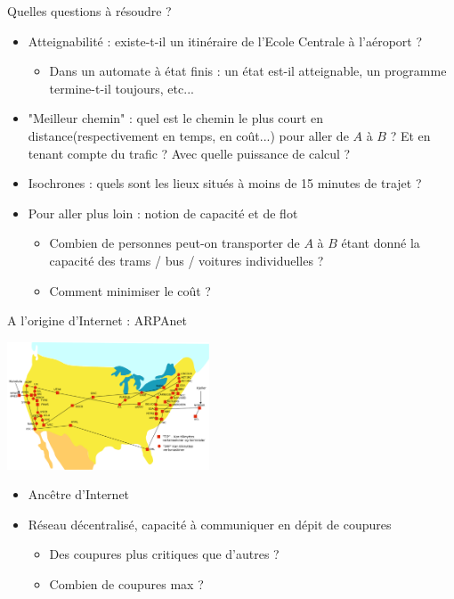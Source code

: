 \begin{frame}{Quelles questions à résoudre ?}
    \begin{itemize}
        \item Atteignabilité : existe-t-il un itinéraire de l'Ecole Centrale à l'aéroport ?
        \begin{itemize}
            \item Dans un automate à état finis : un état est-il atteignable, un programme termine-t-il toujours, etc...
        \end{itemize}
        \item "Meilleur chemin" : quel est le chemin le plus court en distance(respectivement en temps, en coût...) pour aller de $A$ à $B$  ? Et en tenant compte du trafic ? Avec quelle puissance de calcul ?
        \item Isochrones : quels sont les lieux situés à moins de 15 minutes de trajet ? 
        \item Pour aller plus loin : notion de capacité et de flot 
        \begin{itemize}
            \item Combien de personnes peut-on transporter de $A$ à $B$ étant donné la capacité des trams / bus / voitures individuelles ? 
            \item Comment minimiser le coût ?
        \end{itemize}
    \end{itemize}
\end{frame}

\begin{frame}{A l'origine d'Internet : ARPAnet}
    \begin{center}
        \includegraphics[width=6cm]{fig/Arpanet_1974.pdf}
    \end{center}
    \begin{itemize}
        \item Ancêtre d'Internet 
        \item Réseau décentralisé, capacité à communiquer en dépit de coupures 
        \begin{itemize}
            \item Des coupures plus critiques que d'autres ?
            \item Combien de coupures max ?
        \end{itemize}
    \end{itemize}
\end{frame}


